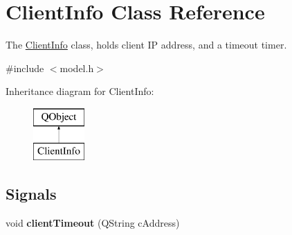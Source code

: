 \hypertarget{class_client_info}{\section{Client\+Info Class Reference}
\label{class_client_info}
}


The \hyperlink{class_client_info}{Client\+Info} class, holds client I\+P address, and a timeout timer.  




{\ttfamily \#include $<$model.\+h$>$}

Inheritance diagram for Client\+Info\+:\begin{figure}[H]
\begin{center}
\leavevmode
\includegraphics[height=2.000000cm]{class_client_info}
\end{center}
\end{figure}
\subsection*{Signals}
\begin{DoxyCompactItemize}
\item 
\hypertarget{class_client_info_a2c4800d43a301e2735b468a7a77f8932}{void {\bfseries client\+Timeout} (Q\+String c\+Address)}\label{class_client_info_a2c4800d43a301e2735b468a7a77f8932}

\end{DoxyCompactItemize}
